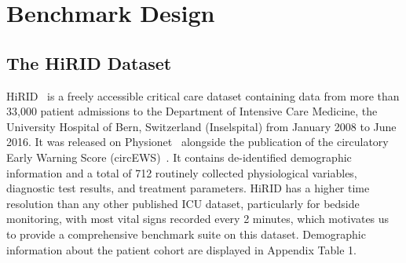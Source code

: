 \documentclass{article}
\begin{document}
\section{Benchmark Design}\label{bench_design}

\subsection{The HiRID Dataset}

HiRID~\citep{hirid, hyland2020early} is a freely accessible critical care dataset containing data from more than 33,000 patient admissions to the Department of Intensive Care Medicine, the University Hospital of Bern, Switzerland (Inselspital) from January 2008 to June 2016. It was released on Physionet~\cite{hirid} alongside the publication of the circulatory Early Warning Score (circEWS)~\cite{hyland2020early}. It contains de-identified demographic information and a total of 712 routinely collected physiological variables, diagnostic test results, and treatment parameters. HiRID has a higher time resolution than any other published ICU dataset, particularly for bedside monitoring, with most vital signs recorded every 2 minutes, which motivates us to provide a comprehensive benchmark suite on this dataset. Demographic information
about the patient cohort are displayed in Appendix Table 1.
\begingroup
\setlength{\tabcolsep}{3pt}
\renewcommand*{\arraystretch}{1}
\end{document}
